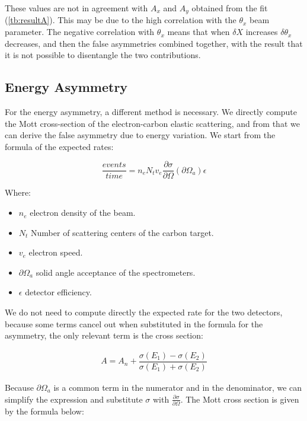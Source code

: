 These values are not in agreement with $A_{x}$ and $A_{y}$ obtained from the fit (\ref{tb:resultA}). This may be due to the high correlation with the $\theta_{x}$ beam parameter. The negative correlation with $\theta_{x}$ means that when $\delta X$ increases $\delta \theta_{x}$ decreases, and then the false asymmetries combined together, with the result that it is not possible to disentangle the two contributions. 

\subsection{Energy Asymmetry}

For the energy asymmetry, a different method is necessary. We directly compute the Mott cross-section of the electron-carbon elastic scattering, and from that we can derive the false asymmetry due to energy variation.
We start from the formula of the expected rates:

\begin{equation}
\frac{events}{time} = n_{e} N_{t} v_{e} \frac{\partial \sigma}{\partial \Omega} (\partial \Omega_{a}) \epsilon 
\end{equation} 

Where:
\begin{itemize}
\item $n_{e}$ electron density of the beam.
\item $N_t$ Number of scattering centers of the carbon target.
\item $v_{e}$ electron speed.
\item $\partial \Omega_{a}$ solid angle acceptance of the spectrometers.
\item $\epsilon$ detector efficiency.
\end{itemize}

We do not need to compute directly the expected rate for the two detectors, because some terms cancel out when substituted in the formula for the asymmetry, the only relevant term is the cross section:

\begin{align*}
A = A_{n} + \dfrac{\sigma(E_{1}) - \sigma(E_{2})}{\sigma(E_{1}) + \sigma(E_{2})}
\end{align*}

Because $\partial \Omega_{a}$ is a common term in the numerator and in the denominator, we can simplify the expression and substitute $\sigma $ with $ \frac{\partial \sigma}{ \partial \Omega}$.
The Mott cross section is given by the formula below:

